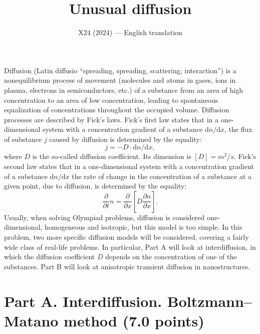\documentclass[11pt,a4paper]{article}
\title{\textbf{Unusual diffusion}}
\author{\normalsize X24 (2024) --- English translation}
\date{}
\begin{document}
\maketitle

Diffusion (Latin diffusio “spreading, spreading, scattering; interaction”) is a nonequilibrium process of movement (molecules and atoms in gases, ions in plasma, electrons in semiconductors, etc.) of a substance from an area of high concentration to an area of low concentration, leading to spontaneous equalization of concentrations throughout the occupied volume. Diffusion processes are described by Fick's laws. Fick's first law states that in a one-dimensional system with a concentration gradient of a substance $\mathrm dn{/}\mathrm dx$, the flux of substance $j$ caused by diffusion is determined by the equality: \[j=-D\cdot\mathrm dn{/}\mathrm dx,\]where $D$ is the so-called diffusion coefficient. Its dimension is $[D]=m^2/s$. Fick's second law states that in a one-dimensional system with a concentration gradient of a substance $\mathrm dn{/}\mathrm dx$ the rate of change in the concentration of a substance at a given point, due to diffusion, is determined by the equality: \[\frac{\partial}{\partial t}n=\frac{\partial}{\partial x}\left[D\frac{\partial n}{\partial x}\right].\] Usually, when solving Olympiad problems, diffusion is considered one-dimensional, homogeneous and isotropic, but this model is too simple. In this problem, two more specific diffusion models will be considered, covering a fairly wide class of real-life problems. In particular, Part A will look at interdiffusion, in which the diffusion coefficient $D$ depends on the concentration of one of the substances. Part B will look at anisotropic transient diffusion in nanostructures.

\section*{Part A. Interdiffusion. Boltzmann–Matano method (7.0 points)}
\end{document}
